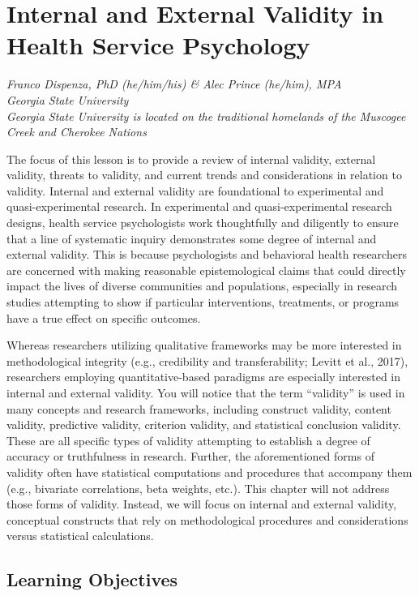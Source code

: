 \documentclass[
  11pt,
]{book}
\begin{document}
\chapter{Internal and External Validity in Health Service Psychology}\label{InExVal}

\emph{Franco Dispenza, PhD (he/him/his) \& Alec Prince (he/him), MPA}\\
\emph{Georgia State University}\\
\emph{Georgia State University is located on the traditional homelands of the Muscogee Creek and Cherokee Nations}

The focus of this lesson is to provide a review of internal validity, external validity, threats to validity, and current trends and considerations in relation to validity. Internal and external validity are foundational to experimental and quasi-experimental research. In experimental and quasi-experimental research designs, health service psychologists work thoughtfully and diligently to ensure that a line of systematic inquiry demonstrates some degree of internal and external validity. This is because psychologists and behavioral health researchers are concerned with making reasonable epistemological claims that could directly impact the lives of diverse communities and populations, especially in research studies attempting to show if particular interventions, treatments, or programs have a true effect on specific outcomes.

Whereas researchers utilizing qualitative frameworks may be more interested in methodological integrity (e.g., credibility and transferability; Levitt et al., 2017), researchers employing quantitative-based paradigms are especially interested in internal and external validity. You will notice that the term ``validity'' is used in many concepts and research frameworks, including construct validity, content validity, predictive validity, criterion validity, and statistical conclusion validity. These are all specific types of validity attempting to establish a degree of accuracy or truthfulness in research. Further, the aforementioned forms of validity often have statistical computations and procedures that accompany them (e.g., bivariate correlations, beta weights, etc.). This chapter will not address those forms of validity. Instead, we will focus on internal and external validity, conceptual constructs that rely on methodological procedures and considerations versus statistical calculations.

\section{Learning Objectives}\label{learning-objectives}
\end{document}
